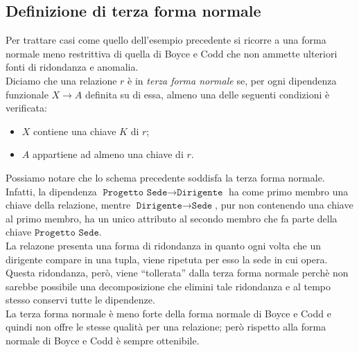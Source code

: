 \documentclass[12pt]{report}
\begin{document}
	\subsection{Definizione di terza forma normale}
	Per trattare casi come quello dell'esempio precedente si ricorre a una forma normale meno restrittiva di quella di Boyce e Codd che non ammette ulteriori fonti di ridondanza e anomalia. \\
	Diciamo che una relazione $r$ è in \textit{terza forma normale} se, per ogni dipendenza funzionale $X \to A$ definita su di essa, almeno una delle seguenti condizioni è verificata:
	\begin{itemize}
		\item $X$ contiene una chiave $K$ di $r$;
		\item $A$ appartiene ad almeno una chiave di $r$.
	\end{itemize}
	Possiamo notare che lo schema precedente soddisfa la terza forma normale. Infatti, la dipendenza $\texttt{Progetto Sede} \to \texttt{Dirigente}$ ha come primo membro una chiave della relazione, mentre $\texttt{Dirigente} \to \texttt{Sede}$, pur non contenendo una chiave al primo membro, ha un unico attributo al secondo membro che fa parte della chiave $\texttt{Progetto Sede}$. \\
	La relazone presenta una forma di ridondanza in quanto ogni volta che un dirigente compare in una tupla, viene ripetuta per esso la sede in cui opera. Questa ridondanza, però, viene ``tollerata'' dalla terza forma normale perchè non sarebbe possibile una decomposizione che elimini tale ridondanza e al tempo stesso conservi tutte le dipendenze. \\
	La terza forma normale è meno forte della forma normale di Boyce e Codd e quindi non offre le stesse qualità per una relazione; però rispetto alla forma normale di Boyce e Codd è sempre ottenibile.
\end{document}
